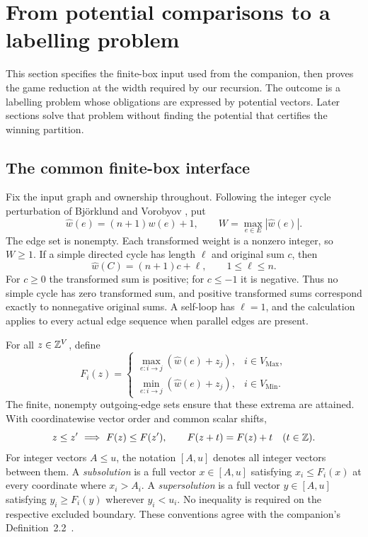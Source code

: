 \section{From potential comparisons to a labelling problem}
\label{sec:boxes}

This section specifies the finite-box input used from the companion,
then proves the game reduction at the width required by our recursion.
The outcome is a labelling problem whose obligations are expressed by
potential vectors. Later sections solve that problem without finding
the potential that certifies the winning partition.

\subsection{The common finite-box interface}

Fix the input graph and ownership throughout. Following the integer
cycle perturbation of Bj\"orklund and Vorobyov
\cite[Section~9]{BjorklundVorobyov2007}, put
\begin{equation}
 \widehat w(e)=(n+1)w(e)+1,
 \qquad W=\max_{e\in E}|\widehat w(e)|.
 \label{eq:bias}
\end{equation}
The edge set is nonempty. Each transformed weight is a nonzero integer,
so $W\ge1$. If a simple directed cycle has length $\ell$ and
original sum $c$, then
\begin{equation}
 \widehat w(C)=(n+1)c+\ell,\qquad 1\le\ell\le n.
 \label{eq:cycle-signs}
\end{equation}
For $c\ge0$ the transformed sum is positive; for $c\le-1$ it is
negative. Thus no simple cycle has zero transformed sum, and positive
transformed sums correspond exactly to nonnegative original sums.
A self-loop has $\ell=1$, and the calculation applies to every
actual edge sequence when parallel edges are present.

For all $z\in\mathbb Z^V$, define
\begin{equation}
 F_i(z)=
 \begin{cases}
  \displaystyle\max_{e:i\to j}(\widehat w(e)+z_j),&i\in V_{\mathrm{Max}},\\[2mm]
  \displaystyle\min_{e:i\to j}(\widehat w(e)+z_j),&i\in V_{\mathrm{Min}}.
 \end{cases}
 \label{eq:operator}
\end{equation}
The finite, nonempty outgoing-edge sets ensure that these extrema are
attained. With coordinatewise vector order and common scalar shifts,
\begin{equation}
 z\le z'\ \Longrightarrow\ F(z)\le F(z'),
 \qquad F(z+t)=F(z)+t\quad(t\in\mathbb Z).
 \label{eq:operator-properties}
\end{equation}
For integer vectors $A\le u$, the notation $[A,u]$ denotes all
integer vectors between them. A \emph{subsolution} is a full vector
$x\in[A,u]$ satisfying $x_i\le F_i(x)$ at every coordinate where
$x_i>A_i$. A \emph{supersolution} is a full vector $y\in[A,u]$
satisfying $y_i\ge F_i(y)$ wherever $y_i<u_i$. No inequality is
required on the respective excluded boundary. These conventions agree
with the companion's Definition~2.2~\cite{OpenAI2026Randomized}.

